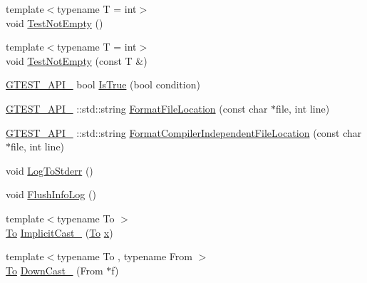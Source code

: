 \begin{DoxyCompactItemize}
{\footnotesize template$<$typename T  = int$>$ }\\void \mbox{\hyperlink{namespacetesting_1_1internal_aa07a04b597551a51d862911b22a94eb9}{Test\+Not\+Empty}} ()
\item 
{\footnotesize template$<$typename T  = int$>$ }\\void \mbox{\hyperlink{namespacetesting_1_1internal_ad2f14c6dc7d6c3d78884910943e11bc1}{Test\+Not\+Empty}} (const T \&)
\item 
\mbox{\hyperlink{_obj__test_2lib_2googletest-release-1_88_81_2googletest_2include_2gtest_2internal_2gtest-port_8h_aa73be6f0ba4a7456180a94904ce17790}{G\+T\+E\+S\+T\+\_\+\+A\+P\+I\+\_\+}} bool \mbox{\hyperlink{namespacetesting_1_1internal_a527b9bcc13669b9a16400c8514266254}{Is\+True}} (bool condition)
\item 
\mbox{\hyperlink{_obj__test_2lib_2googletest-release-1_88_81_2googletest_2include_2gtest_2internal_2gtest-port_8h_aa73be6f0ba4a7456180a94904ce17790}{G\+T\+E\+S\+T\+\_\+\+A\+P\+I\+\_\+}} \+::std\+::string \mbox{\hyperlink{namespacetesting_1_1internal_a31b7c3abed4a7c395f42c61e993989f4}{Format\+File\+Location}} (const char $\ast$file, int line)
\item 
\mbox{\hyperlink{_obj__test_2lib_2googletest-release-1_88_81_2googletest_2include_2gtest_2internal_2gtest-port_8h_aa73be6f0ba4a7456180a94904ce17790}{G\+T\+E\+S\+T\+\_\+\+A\+P\+I\+\_\+}} \+::std\+::string \mbox{\hyperlink{namespacetesting_1_1internal_a1ee4cde97868c53e442d3182496a9f3c}{Format\+Compiler\+Independent\+File\+Location}} (const char $\ast$file, int line)
\item 
void \mbox{\hyperlink{namespacetesting_1_1internal_a06b1b20029fbd1dbeb59752f914fab84}{Log\+To\+Stderr}} ()
\item 
void \mbox{\hyperlink{namespacetesting_1_1internal_a2135f223bf6b527729aeaa651115183b}{Flush\+Info\+Log}} ()
\item 
{\footnotesize template$<$typename To $>$ }\\\mbox{\hyperlink{classtesting_1_1internal_1_1_to}{To}} \mbox{\hyperlink{namespacetesting_1_1internal_a982df3f369643b175f79cda4048bc3b9}{Implicit\+Cast\+\_\+}} (\mbox{\hyperlink{classtesting_1_1internal_1_1_to}{To}} \mbox{\hyperlink{_obj__test_2lib_2googletest-master_2googlemock_2test_2gmock-matchers__test_8cc_a6150e0515f7202e2fb518f7206ed97dc}{x}})
\item 
{\footnotesize template$<$typename To , typename From $>$ }\\\mbox{\hyperlink{classtesting_1_1internal_1_1_to}{To}} \mbox{\hyperlink{namespacetesting_1_1internal_a1a1a1aed3fe00908b8a45d5ab4a33665}{Down\+Cast\+\_\+}} (From $\ast$f)

\end{DoxyCompactItemize}
